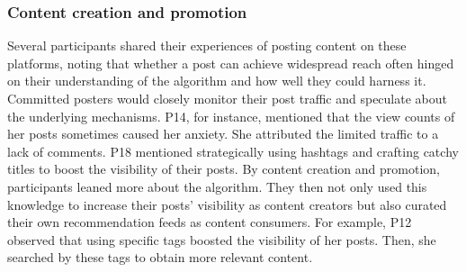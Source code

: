 
\subsubsection{Content creation and promotion}
Several participants shared their experiences of posting content on these platforms, noting that whether a post can achieve widespread reach often hinged on their understanding of the algorithm and how well they could harness it. Committed posters would closely monitor their post traffic and speculate about the underlying mechanisms. P14, for instance, mentioned that the view counts of her posts sometimes caused her anxiety. She attributed the limited traffic to a  lack of comments. P18 mentioned strategically using hashtags and crafting catchy titles to boost the visibility of their posts. By content creation and promotion, participants leaned more about the algorithm. They then not only used this knowledge to increase their posts' visibility as content creators but also curated their own recommendation feeds as content consumers. For example, P12 observed that using specific tags boosted the visibility of her posts. Then, she searched by these tags to obtain more relevant content.


